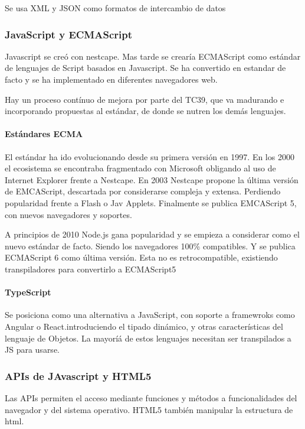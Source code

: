         Se usa XML y JSON como formatos de intercambio de datos 

    \subsubsection{JavaScript y ECMAScript}
        Javascript se creó con nestcape. Mas tarde se crearía ECMAScript como estándar de lenguajes de Script basados en Javascript. Se ha convertido en estandar de facto y se ha implementado en diferentes navegadores web.

        Hay un proceso contínuo de mejora por parte del TC39, que va madurando e incorporando propuestas al estándar, de donde se nutren los demás lenguajes.

        \paragraph{Estándares ECMA}

        El estándar ha ido evolucionando desde su primera versión en 1997. En los 2000 el ecosistema se encontraba fragmentado con Microsoft obligando al uso de Internet Explorer frente a Nestcape. En 2003 Nestcape propone la última versión de EMCAScript, descartada por considerarse compleja y extensa. Perdiendo popularidad frente a Flash o Jav Applets. Finalmente se publica EMCAScript 5, con nuevos navegadores y soportes.

        A principios de 2010 Node.js gana popularidad y se empieza a considerar como el nuevo estándar de facto. Siendo los navegadores 100\% compatibles. Y se publica ECMAScript 6 como última versión. Esta no es retrocompatible, existiendo transpiladores para convertirlo a ECMAScript5

        \paragraph{TypeScript}
            Se posiciona como una alternativa a JavaScript, con soporte a framewroks como Angular o React.introduciendo el tipado dinámico, y otras características del lenguaje de Objetos. La mayoríá de estos lenguajes necesitan ser transpilados a JS para usarse.

    \subsubsection{APIs de JAvascript y HTML5}
        Las APIs permiten el acceso mediante funciones y métodos a funcionalidades del navegador y del sistema operativo. HTML5 también manipular la estructura de html.

